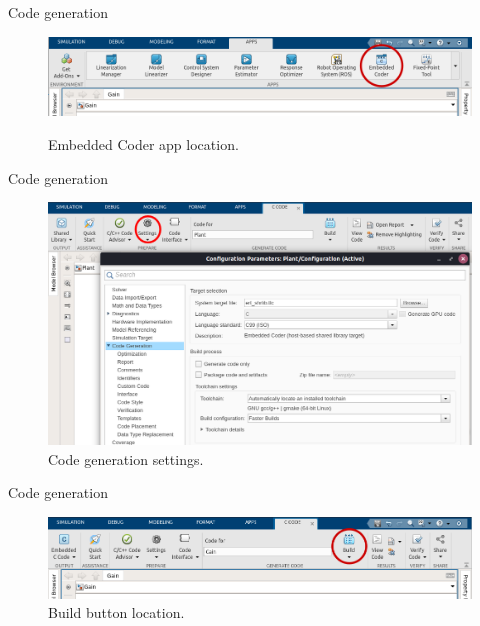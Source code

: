 \begin{frame}{Code generation}
	\begin{figure}
		\centering
		\includegraphics[width=\textwidth]{Embedded.png}
		\label{fig:embedded}
		\caption{Embedded Coder app location.}
	\end{figure}
\end{frame}
\begin{frame}{Code generation}
	\begin{figure}
		\centering
		\includegraphics[scale=.27]{Settings.png}
		\caption{Code generation settings.}
		\label{fig:settingd}
	\end{figure}
\end{frame}
\begin{frame}{Code generation}
	\begin{figure}
		\centering
		\includegraphics[width=\textwidth]{Build.png}
		\caption{Build button location.}
		\label{fig:build}
	\end{figure}
\end{frame}

